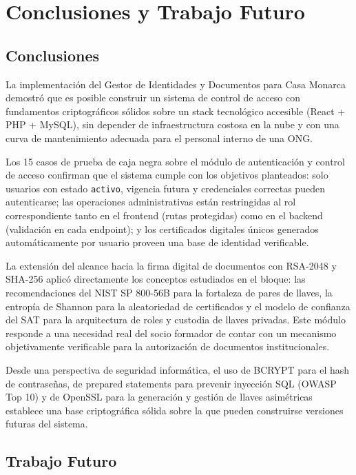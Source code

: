 \documentclass[10pt,letterpaper]{report}
\begin{document}
\chapter{Conclusiones y Trabajo Futuro}

\section{Conclusiones}

La implementación del Gestor de Identidades y Documentos para Casa Monarca demostró que es posible construir un sistema de control de acceso con fundamentos criptográficos sólidos sobre un stack tecnológico accesible (React + PHP + MySQL), sin depender de infraestructura costosa en la nube y con una curva de mantenimiento adecuada para el personal interno de una ONG.

Los 15 casos de prueba de caja negra sobre el módulo de autenticación y control de acceso confirman que el sistema cumple con los objetivos planteados: solo usuarios con estado \texttt{activo}, vigencia futura y credenciales correctas pueden autenticarse; las operaciones administrativas están restringidas al rol correspondiente tanto en el frontend (rutas protegidas) como en el backend (validación en cada endpoint); y los certificados digitales únicos generados automáticamente por usuario proveen una base de identidad verificable.

La extensión del alcance hacia la firma digital de documentos con RSA-2048 y SHA-256 aplicó directamente los conceptos estudiados en el bloque: las recomendaciones del NIST SP 800-56B para la fortaleza de pares de llaves, la entropía de Shannon para la aleatoriedad de certificados y el modelo de confianza del SAT para la arquitectura de roles y custodia de llaves privadas. Este módulo responde a una necesidad real del socio formador de contar con un mecanismo objetivamente verificable para la autorización de documentos institucionales.

Desde una perspectiva de seguridad informática, el uso de BCRYPT para el hash de contraseñas, de prepared statements para prevenir inyección SQL (OWASP Top 10) y de OpenSSL para la generación y gestión de llaves asimétricas establece una base criptográfica sólida sobre la que pueden construirse versiones futuras del sistema.

\section{Trabajo Futuro}
\end{document}

